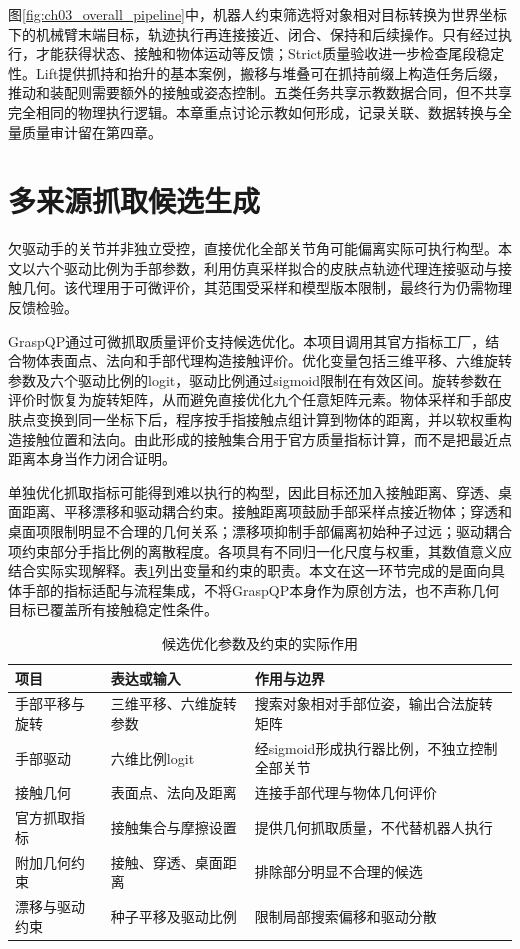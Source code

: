 图\ref{fig:ch03_overall_pipeline}中，机器人约束筛选将对象相对目标转换为世界坐标下的机械臂末端目标，轨迹执行再连接接近、闭合、保持和后续操作。只有经过执行，才能获得状态、接触和物体运动等反馈；Strict质量验收进一步检查尾段稳定性。Lift提供抓持和抬升的基本案例，搬移与堆叠可在抓持前缀上构造任务后缀，推动和装配则需要额外的接触或姿态控制。五类任务共享示教数据合同，但不共享完全相同的物理执行逻辑。本章重点讨论示教如何形成，记录关联、数据转换与全量质量审计留在第四章。

\section{多来源抓取候选生成}
\label{sec:grasp_candidate_generation}

欠驱动手的关节并非独立受控，直接优化全部关节角可能偏离实际可执行构型。本文以六个驱动比例为手部参数，利用仿真采样拟合的皮肤点轨迹代理连接驱动与接触几何。该代理用于可微评价，其范围受采样和模型版本限制，最终行为仍需物理反馈检验。

GraspQP通过可微抓取质量评价支持候选优化\cite{zurbrugg2025graspqp}。本项目调用其官方指标工厂，结合物体表面点、法向和手部代理构造接触评价。优化变量包括三维平移、六维旋转参数及六个驱动比例的logit，驱动比例通过sigmoid限制在有效区间。旋转参数在评价时恢复为旋转矩阵，从而避免直接优化九个任意矩阵元素。物体采样和手部皮肤点变换到同一坐标下后，程序按手指接触点组计算到物体的距离，并以软权重构造接触位置和法向。由此形成的接触集合用于官方质量指标计算，而不是把最近点距离本身当作力闭合证明。

单独优化抓取指标可能得到难以执行的构型，因此目标还加入接触距离、穿透、桌面距离、平移漂移和驱动耦合约束。接触距离项鼓励手部采样点接近物体；穿透和桌面项限制明显不合理的几何关系；漂移项抑制手部偏离初始种子过远；驱动耦合项约束部分手指比例的离散程度。各项具有不同归一化尺度与权重，其数值意义应结合实际实现解释。表\ref{tab:ch03_candidate_parameters}列出变量和约束的职责。本文在这一环节完成的是面向具体手部的指标适配与流程集成，不将GraspQP本身作为原创方法，也不声称几何目标已覆盖所有接触稳定性条件。

\begin{table}[htbp]
 \centering\small
 \caption{候选优化参数及约束的实际作用}
 \label{tab:ch03_candidate_parameters}
 \begin{tabular}{p{}p{}p{}}
 \hline
 项目 & 表达或输入 & 作用与边界\\
 \hline
 手部平移与旋转 & 三维平移、六维旋转参数 & 搜索对象相对手部位姿，输出合法旋转矩阵\\
 手部驱动 & 六维比例logit & 经sigmoid形成执行器比例，不独立控制全部关节\\
 接触几何 & 表面点、法向及距离 & 连接手部代理与物体几何评价\\
 官方抓取指标 & 接触集合与摩擦设置 & 提供几何抓取质量，不代替机器人执行\\
 附加几何约束 & 接触、穿透、桌面距离 & 排除部分明显不合理的候选\\
 漂移与驱动约束 & 种子平移及驱动比例 & 限制局部搜索偏移和驱动分散\\
 \hline
 \end{tabular}
\end{table}

